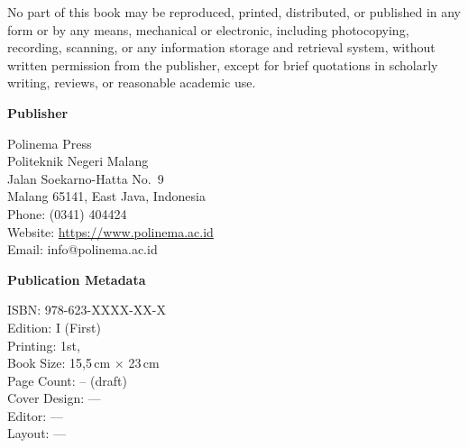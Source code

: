 \begin{titlepage}
\begin{tcolorbox}[
    enhanced,
    width=\linewidth,
    colback=white,
    colframe=black!45,
    boxrule=0.5pt,
    arc=1.5pt,
    left=8pt,
    right=8pt,
    top=8pt,
    bottom=8pt
]
No part of this book may be reproduced, printed, distributed, or published in
any form or by any means, mechanical or electronic, including photocopying,
recording, scanning, or any information storage and retrieval system, without
written permission from the publisher, except for brief quotations in scholarly
writing, reviews, or reasonable academic use.
\end{tcolorbox}

\vspace{0.45cm}

\begin{minipage}[t]{0.48\textwidth}
\begin{tcolorbox}[
    enhanced,
    width=\linewidth,
    colback=black!2,
    colframe=black!45,
    boxrule=0.5pt,
    arc=1.5pt,
    left=8pt,
    right=8pt,
    top=8pt,
    bottom=8pt,
    height=6.25cm
]
{\bfseries\sffamily Publisher}\par
\vspace{0.25cm}
Polinema Press\\
Politeknik Negeri Malang\\
Jalan Soekarno-Hatta No.~9\\
Malang 65141, East Java, Indonesia\\[0.2cm]
Phone: (0341) 404424\\
Website: \url{https://www.polinema.ac.id}\\
Email: info@polinema.ac.id
\end{tcolorbox}
\end{minipage}
\hfill
\begin{minipage}[t]{0.48\textwidth}
\begin{tcolorbox}[
    enhanced,
    width=\linewidth,
    colback=black!2,
    colframe=black!45,
    boxrule=0.5pt,
    arc=1.5pt,
    left=8pt,
    right=8pt,
    top=8pt,
    bottom=8pt,
    height=6.25cm
]
{\bfseries\sffamily Publication Metadata}\par
\vspace{0.25cm}
ISBN: 978-623-XXXX-XX-X\\
Edition: I (First)\\
Printing: 1st, \the\year\\
Book Size: 15{,}5\,cm $\times$ 23\,cm\\
Page Count: -- (draft)\\
Cover Design: ---\\
Editor: ---\\
Layout: ---
\end{tcolorbox}
\end{minipage}


\end{titlepage}
